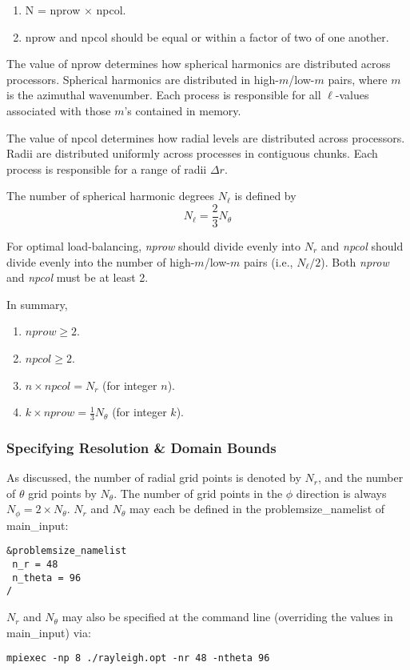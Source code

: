 \begin{enumerate}
\item N = nprow $\times$ npcol.                                           
\item nprow and npcol should be equal or within a factor of two of one another.                   
\end{enumerate}

The value of nprow determines how spherical harmonics are distributed across processors.   Spherical harmonics are distributed in high-$m$/low-$m$ pairs, where $m$ is the azimuthal wavenumber.  Each process is responsible for all $\ell$-values associated with those $m$'s contained in memory.

The value of npcol determines how radial levels are distributed across processors.  Radii are distributed uniformly across processes in contiguous chunks.  Each process is responsible for a range of radii $\Delta r$.

The number of spherical harmonic degrees $N_\ell$ is defined by
\begin{equation}
N_\ell = \frac{2}{3}N_\theta
\end{equation}

For optimal load-balancing, \textit{nprow} should divide evenly into $N_r$ and \textit{npcol} should divide evenly into the number of high-$m$/low-$m$ pairs (i.e., $N_\ell/2$).  Both \textit{nprow} and \textit{npcol} must be at least 2.

In summary,
\begin{enumerate}
\item $nprow \ge 2$.
\item $npcol \ge 2$.
\item $n \times npcol = N_r$ (for integer $n$).
\item $k \times nprow = \frac{1}{3}N_\theta$ (for integer $k$).
\end{enumerate}

\subsubsection{Specifying Resolution \& Domain Bounds}
As discussed, the number of radial grid points is denoted by $N_r$, and the number of $\theta$ grid points by $N_\theta$.  The number of grid points in the $\phi$ direction is always $N_\phi=2\times N_\theta$.  $N_r$ and $N_\theta$ may each be defined in the problemsize\_namelist of main\_input:
\begin{lstlisting}
&problemsize_namelist
 n_r = 48
 n_theta = 96
/
\end{lstlisting}
$N_r$ and $N_\theta$ may also be specified at the command line (overriding the values in main\_input) via:
\begin{lstlisting}
mpiexec -np 8 ./rayleigh.opt -nr 48 -ntheta 96
\end{lstlisting}

